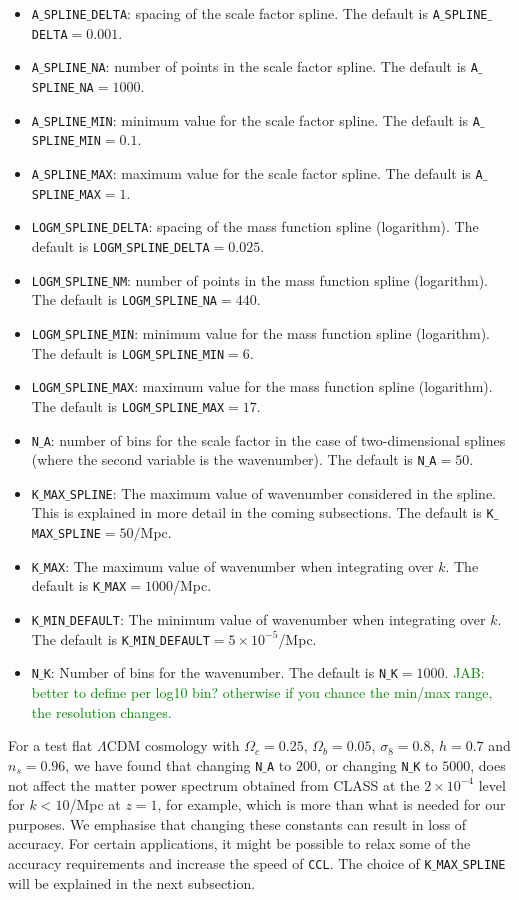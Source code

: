 \documentclass[\docopts]{\docclass}
\newcommand{\jab}[1]{\textcolor{green}{JAB: #1}}
\begin{document}
\begin{itemize}
\item {\tt A$\_$SPLINE$\_$DELTA}: spacing of the scale factor spline. The default is {\tt A$\_$SPLINE$\_$DELTA}$=0.001$.
\item {\tt A$\_$SPLINE$\_$NA}: number of points in the scale factor spline. The default is {\tt A$\_$SPLINE$\_$NA}$=1000$.
\item {\tt A$\_$SPLINE$\_$MIN}: minimum value for the scale factor spline. The default is {\tt A$\_$SPLINE$\_$MIN}$=0.1$.
\item {\tt A$\_$SPLINE$\_$MAX}: maximum value for the scale factor spline. The default is {\tt A$\_$SPLINE$\_$MAX}$=1$.
\item {\tt LOGM$\_$SPLINE$\_$DELTA}: spacing of the mass function spline (logarithm). The default is {\tt LOGM$\_$SPLINE$\_$DELTA}$=0.025$.
\item {\tt LOGM$\_$SPLINE$\_$NM}: number of points in the mass function spline (logarithm). The default is {\tt LOGM$\_$SPLINE$\_$NA}$=440$.
\item {\tt LOGM$\_$SPLINE$\_$MIN}: minimum value for the mass function spline (logarithm). The default is {\tt LOGM$\_$SPLINE$\_$MIN}$=6$.
\item {\tt LOGM$\_$SPLINE$\_$MAX}: maximum value for the mass function spline (logarithm). The default is {\tt LOGM$\_$SPLINE$\_$MAX}$=17$.
\item {\tt N$\_$A}: number of bins for the scale factor in the case of two-dimensional splines (where the second variable is the wavenumber). The default is {\tt N$\_$A}$=50$. 
\item {\tt K$\_$MAX$\_$SPLINE}: The maximum value of wavenumber considered in the spline. This is explained in more detail in the coming subsections. The default is {\tt K$\_$MAX$\_$SPLINE}$=50/$Mpc.  
\item {\tt K$\_$MAX}: The maximum value of wavenumber when integrating over $k$. The default is {\tt K$\_$MAX}$=1000$/Mpc.  
\item {\tt K$\_$MIN$\_$DEFAULT}:  The minimum value of wavenumber when integrating over $k$. The default is {\tt K$\_$MIN$\_$DEFAULT}$=5 \times 10^{-5}$/Mpc. 
\item {\tt N$\_$K}: Number of bins for the wavenumber. The default is {\tt N$\_$K}$=1000$.  \jab{better to define per log10 bin? otherwise if you chance the min/max range, the resolution changes.}
\end{itemize}

For a test flat $\Lambda$CDM cosmology with $\Omega_c=0.25$, $\Omega_b=0.05$, $\sigma_8=0.8$, $h=0.7$ and $n_s=0.96$, we have found that changing {\tt N$\_$A} to $200$, or changing {\tt N$\_$K} to $5000$, does not affect the matter power spectrum obtained from CLASS at the $2\times 10^{-4}$ level for $k<10$/Mpc at $z=1$, for example, which is more than what is needed for our purposes. We emphasise that changing these constants can result in loss of accuracy. For certain applications, it might be possible to relax some of the accuracy requirements and increase the speed of {\tt CCL}. The choice of {\tt K$\_$MAX$\_$SPLINE} will be explained in the next subsection.
\end{document}
